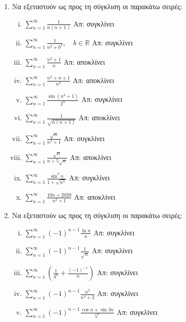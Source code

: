 \documentclass[a4paper,table]{report}
\begin{document}
\begin{center}
  \minibox{\large \bfseries \textcolor{Col1}{Ασκήσεις στις Σειρές}}
\end{center}

\vspace{\baselineskip}

\begin{enumerate}
  \item Να εξεταστούν ως προς τη σύγκλιση οι παρακάτω σειρές: 
    \begin{enumerate}[i)]
      \item $ \sum_{n=1}^{\infty} \frac{1}{n(n+1)} $ \hfill Απ: συγκλίνει 
      \item $ \sum_{n=1}^{\infty} \frac{1}{n^{2}+b^{2}}, \quad b \in \mathbb{R} $ 
        \hfill Απ: συγκλίνει 
      \item $ \sum_{n=1}^{\infty} \frac{n^{2}+1}{n} $ \hfill Απ: αποκλίνει 
      \item $ \sum_{n=1}^{\infty} \frac{n^{2}+n+1}{n^{3}} $ \hfill Απ: αποκλίνει 
      \item $ \sum_{n=1}^{\infty} \frac{\sin{(n^{3}+1)}}{2^{n}} $ \hfill Απ: συγκλίνει 
      \item $ \sum_{n=1}^{\infty} \frac{1}{\sqrt{n(n+1)}} $ \hfill Απ: αποκλίνει 
      \item $ \sum_{n=1}^{\infty} \frac{\sqrt{n}}{n^{3}+1} $ \hfill Απ: συγκλίνει 
      \item $ \sum_{n=1}^{\infty} \frac{\sqrt{n}}{n+5 \sqrt{n}} $ \hfill Απ: αποκλίνει 
      \item $ \sum_{n=1}^{\infty} \frac{\sin^{4}{n}}{1+ \sqrt{n^{5}}} $ 
        \hfill Απ: συγκλίνει 
      \item $ \sum_{n=1}^{\infty} \frac{10n+2020}{n^{2}+1} $ \hfill Απ: αποκλίνει 
    \end{enumerate}

  \item Να εξεταστούν ως προς τη σύγκλιση οι παρακάτω σειρές: 
    \begin{enumerate}[i)]
      \item $ \sum_{n=1}^{\infty} (-1)^{n-1} \frac{\ln{n}}{n} $ \hfill Απ: συγκλίνει 
      \item $ \sum_{n=1}^{\infty} (-1)^{n-1} \frac{1}{\sqrt{n}} $ \hfill Απ: συγκλίνει 
      \item $ \sum_{n=1}^{\infty} \left(\frac{1}{4^{n}} + \frac{(-1)^{-1}}{n}\right) $ 
        \hfill Απ: συγκλίνει 
      \item $ \sum_{n=1}^{\infty} (-1)^{n-1} \frac{n^{2}}{n^{4}+2} $ 
        \hfill Απ: συγκλίνει 
      \item $ \sum_{n=1}^{\infty} (-1)^{n-1} \frac{\cos{n} + \sin{3n}}{5^{n}} $ 
        \hfill Απ: συγκλίνει
    \end{enumerate}
\end{enumerate}
\end{document}
